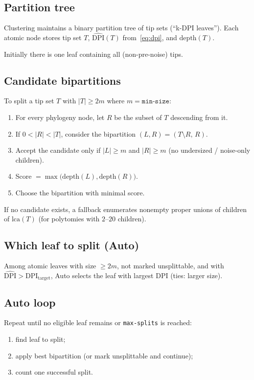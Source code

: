\documentclass[11pt,a4paper]{article}
\begin{document}
\subsection{Partition tree}
Clustering maintains a binary partition tree of tip sets (``k-DPI leaves'').
Each atomic node stores tip set $T$,
$\widehat{\mathrm{DPI}}(T)$ from~\eqref{eq:dpi}, and $\mathrm{depth}(T)$.

Initially there is one leaf containing all (non-pre-noise) tips.

\subsection{Candidate bipartitions}
To split a tip set $T$ with $|T|\ge 2m$ where $m=\texttt{min-size}$:
\begin{enumerate}
  \item For every phylogeny node, let $R$ be the subset of $T$ descending from it.
  \item If $0<|R|<|T|$, consider the bipartition
        $(L,R)=(T\setminus R,\,R)$.
  \item Accept the candidate only if $|L|\ge m$ and $|R|\ge m$
        (no undersized / noise-only children).
  \item Score $=\max\bigl(\mathrm{depth}(L),\mathrm{depth}(R)\bigr)$.
  \item Choose the bipartition with minimal score.
\end{enumerate}
If no candidate exists, a fallback enumerates nonempty proper unions of
children of $\mathrm{lca}(T)$ (for polytomies with $2$--$20$ children).

\subsection{Which leaf to split (Auto)}
Among atomic leaves with size $\ge 2m$, not marked unsplittable, and with
$\widehat{\mathrm{DPI}}>\mathrm{DPI}_{\mathrm{target}}$,
Auto selects the leaf with largest DPI (ties: larger size).

\subsection{Auto loop}
Repeat until no eligible leaf remains or \texttt{max-splits} is reached:
\begin{enumerate}[nosep]
  \item find leaf to split;
  \item apply best bipartition (or mark unsplittable and continue);
  \item count one successful split.
\end{enumerate}
\end{document}
